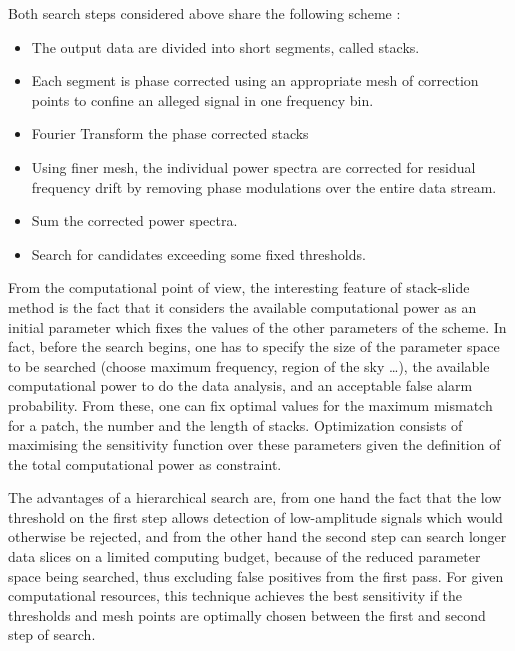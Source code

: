 Both search steps considered above share the following scheme \cite{BRADY1}: 
\begin{itemize}
\item The output data are divided into short segments, called stacks.
\item Each segment is phase corrected using an appropriate mesh of correction points to confine an alleged signal in one frequency bin.
\item Fourier Transform the phase corrected stacks
\item Using finer mesh, the individual power spectra are corrected for residual frequency drift by removing phase modulations over the entire data stream.
\item Sum the corrected power spectra.
\item Search for candidates exceeding some fixed thresholds.
\end{itemize}


From the computational point of view, the interesting feature of stack-slide method is the fact that it considers the available computational power as an initial parameter which fixes the values of the other parameters of the scheme. In fact,  before the search begins, one has to specify the size of the parameter space to be searched (choose maximum frequency,  region of the sky \dots), the available computational power to do the data analysis, and an acceptable false alarm probability. From these, one can fix optimal values for the maximum mismatch for a patch, the number and the length  of stacks. Optimization consists of maximising the sensitivity function over these parameters given the definition of the total computational power as constraint.

The advantages of a hierarchical search are, from one hand the fact that the low threshold on the first step allows detection of low-amplitude signals which would otherwise be rejected, and from the other hand the second step can search longer data slices on a limited computing budget, because of the reduced parameter space being searched, thus excluding false positives from the first pass. For given computational resources, this technique achieves the best sensitivity if the thresholds and mesh points are optimally chosen between the first and second step of search.

